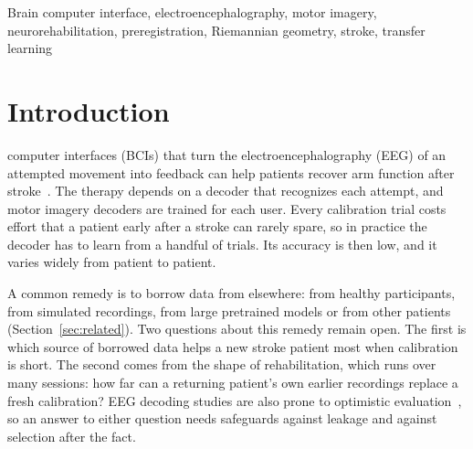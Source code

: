 \documentclass{ieeeaccess}
\begin{document}
\begin{keywords}
Brain computer interface, electroencephalography, motor imagery, neurorehabilitation, preregistration, Riemannian geometry, stroke, transfer learning
\end{keywords}

\titlepgskip=-15pt

\maketitle

\section{Introduction}\label{sec:intro}

 computer interfaces (BCIs) that turn the electroencephalography (EEG) of an attempted movement into feedback can help patients recover arm function after stroke~\cite{mortezaei2026}. The therapy depends on a decoder that recognizes each attempt, and motor imagery decoders are trained for each user. Every calibration trial costs effort that a patient early after a stroke can rarely spare, so in practice the decoder has to learn from a handful of trials. Its accuracy is then low, and it varies widely from patient to patient.

A common remedy is to borrow data from elsewhere: from healthy participants, from simulated recordings, from large pretrained models or from other patients (Section~\ref{sec:related}). Two questions about this remedy remain open. The first is which source of borrowed data helps a new stroke patient most when calibration is short. The second comes from the shape of rehabilitation, which runs over many sessions: how far can a returning patient's own earlier recordings replace a fresh calibration? EEG decoding studies are also prone to optimistic evaluation~\cite{brookshire2024}, so an answer to either question needs safeguards against leakage and against selection after the fact.
\end{document}
